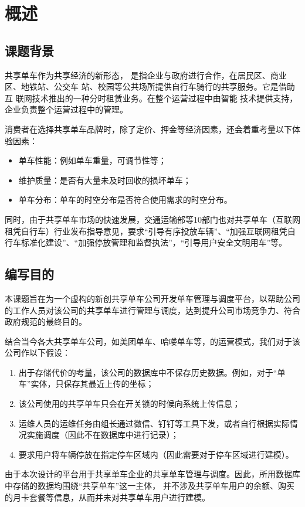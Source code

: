 \chapter{概述}
\thispagestyle{empty}
\section{课题背景}
共享单车作为共享经济的新形态，
是指企业与政府进行合作，在居民区、商业区、地铁站、公交车
站、校园等公共场所提供自行车骑行的共享服务。它是借助互
联网技术推出的一种分时租赁业务。在整个运营过程中由智能
技术提供支持，企业负责整个运营过程中的管理\cite{article1}。

消费者在选择共享单车品牌时，除了定价、押金等经济因素，还会着重考量以下体验因素：
\begin{itemize}
    \item 单车性能：例如单车重量，可调节性等；
    \item 维护质量：是否有大量未及时回收的损坏单车；
    \item 单车分布：单车的时空分布是否符合使用需求的时空分布。
\end{itemize}

同时，由于共享单车市场的快速发展，交通运输部等10部门也对共享单车（互联网租凭自行车）行业发布指导意见，要求“引导有序投放车辆”、“加强互联网租凭自行车标准化建设”、“加强停放管理和监督执法”，“引导用户安全文明用车”等。

\section{编写目的}

本课题旨在为一个虚构的新创共享单车公司开发单车管理与调度平台，以帮助公司的工作人员对该公司的共享单车进行管理与调度，达到提升公司市场竞争力、符合政府规范的最终目的。

结合当今各大共享单车公司，如美团单车、哈喽单车等，的运营模式，我们对于该公司作以下假设：
\begin{enumerate}
    \item 出于存储代价的考量，该公司的数据库中不保存历史数据。例如，对于“单车”实体，只保存其最近上传的坐标；
    \item 该公司使用的共享单车只会在开关锁的时候向系统上传信息；
    \item 运维人员的运维任务由组长通过微信、钉钉等工具下发，或者自行根据实际情况实施调度（因此不在数据库中进行记录）；
    \item 要求用户将车辆停放在指定停车区域内（因此需要对于停车区域进行建模）。
\end{enumerate}

由于本次设计的平台用于共享单车企业的共享单车管理与调度。因此，所用数据库中存储的数据均围绕“共享单车”这一主体，
并不涉及共享单车用户的余额、购买的月卡套餐等信息，从而并未对共享单车用户进行建模。

